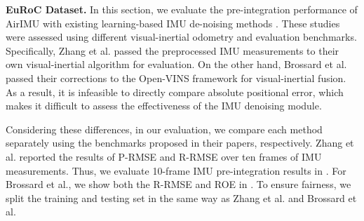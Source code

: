 \textbf{EuRoC Dataset.}
In this section, we evaluate the pre-integration performance of AirIMU with existing learning-based IMU de-noising methods \cite{zhang2021imu, brossard2020denoising}.
These studies were assessed using different visual-inertial odometry and evaluation benchmarks.
Specifically, Zhang et al. passed the preprocessed IMU measurements to their own visual-inertial algorithm for evaluation.
On the other hand, Brossard et al. passed their corrections to the Open-VINS framework \cite{geneva2020openvins} for visual-inertial fusion.
As a result, it is infeasible to directly compare absolute positional error, which makes it difficult to assess the effectiveness of the IMU denoising module.

Considering these differences, in our evaluation, we compare each method separately using the benchmarks proposed in their papers, respectively.
Zhang et al. reported the results of P-RMSE and R-RMSE over ten frames of IMU measurements. 
Thus, we evaluate 10-frame IMU pre-integration results in .
For Brossard et al., we show both the R-RMSE and ROE in .
To ensure fairness, we split the training and testing set in the same way as Zhang et al. and Brossard et al.


\begin{table}[H]
    \caption{IMU integration result of 10 frames on EuRoC Dataset with P-RMSE (Unit: \si{\cm}) and R-RMSE (Unit: \si{\degree})}
    \label{Tab: IMUpre}
    \centering
\end{table}

